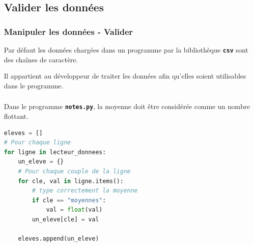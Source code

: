 \documentclass[svgnames,11pt]{beamer}
\begin{document}
\subsection{Valider les données}
\begin{frame}
    \frametitle{Manipuler les données - Valider}
    \begin{aretenir}[]
        Par défaut les données chargées dans un programme par la bibliothèque \textbf{\texttt{csv}} sont des chaînes de caractère.
    \end{aretenir}
    \begin{aretenir}[Remarque]
    Il appartient au développeur de traiter les données afin qu'elles soient utilisables dans le programme.
    \end{aretenir}
\end{frame}
\begin{frame}[fragile]
    \frametitle{}
Dans le programme \textbf{\texttt{notes.py}}, la moyenne doit être considérée comme un nombre flottant.
    \begin{center}
        \begin{lstlisting}[language=Python, xleftmargin=1em,xrightmargin=1em,basicstyle=\ttfamily\small]
eleves = []
# Pour chaque ligne
for ligne in lecteur_donnees:
    un_eleve = {}
    # Pour chaque couple de la ligne
    for cle, val in ligne.items():
        # type correctement la moyenne
        if cle == "moyennes":
            val = float(val)
        un_eleve[cle] = val
    
    eleves.append(un_eleve)
\end{lstlisting}
        \label{CODE}
    \end{center} 

\end{frame}
\end{document}
